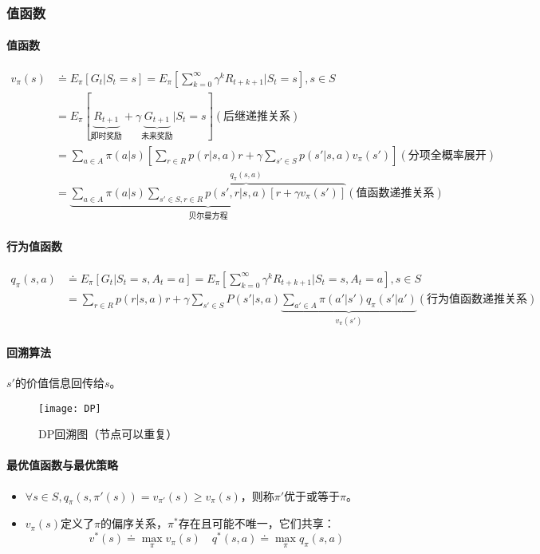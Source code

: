 \documentclass[
12pt, %
a4paper, 
oneside, %
headinclude,footinclude, %
]{scrartcl}
\begin{document}
\subsubsection[值函数]{值函数}
\paragraph{值函数}
\begin{align*}
v_\pi(s) &\doteq E_\pi[G_t|S_t = s] = E_\pi[\sum_{k = 0}^{\infty} \gamma^k R_{t + k + 1}|S_t = s], s \in S \\
&= E_\pi[\underbrace{R_{t + 1}}_{\text{即时奖励}} + \gamma \underbrace{G_{t + 1}}_{\text{未来奖励}}|S_t = s] (\text{后继递推关系}) \\
&= \sum_{a \in A} \pi(a|s)[\sum_{r \in R} p(r|s, a)r + \gamma \sum_{s' \in S} p(s'|s, a)v_{\pi}(s')] (\text{分项全概率展开}) \\
&= \underbrace{\sum_{a \in A} \pi(a|s) \overbrace{\sum_{s' \in S, r \in R} p(s', r|s, a)[r + \gamma v_\pi(s')]}^{q_{\pi}(s, a)}}_{\text{贝尔曼方程}} (\text{值函数递推关系})
\end{align*}
\paragraph{行为值函数}
\begin{align*} 
q_\pi(s, a) &\doteq E_\pi[G_t|S_t = s, A_t = a] = E_\pi[\sum_{k = 0}^{\infty} \gamma^k R_{t + k + 1}|S_t = s, A_t = a], s \in S \\
&= \sum_{r \in R} p(r|s, a)r + \gamma \sum_{s' \in S} P(s'|s, a) \underbrace{\sum_{a' \in A} \pi(a'|s')q_{\pi}(s'|a')}_{v_{\pi}(s')} (\text{行为值函数递推关系})
\end{align*}
\paragraph{回溯算法}
$ s' $的价值信息回传给$ s $。

\begin{figure}[H]
\centering 
\texttt{[image: DP]} 
\caption{DP回溯图（节点可以重复）}
\end{figure}
\paragraph{最优值函数与最优策略}
\begin{itemize}
\item $ \forall s \in S, q_{\pi}(s, \pi'(s)) = v_{\pi'}(s) \geq v_{\pi}(s) $，则称$ \pi' $优于或等于$ \pi $。
\item $ v_\pi(s) $定义了$ \pi $的偏序关系，$ \pi^* $存在且可能不唯一，它们共享：
$$ v^*(s) \doteq \max_{\pi} v_{\pi}(s) \quad q^*(s, a) \doteq \max_{\pi} q_{\pi}(s, a) $$
\end{itemize}
\end{document}
